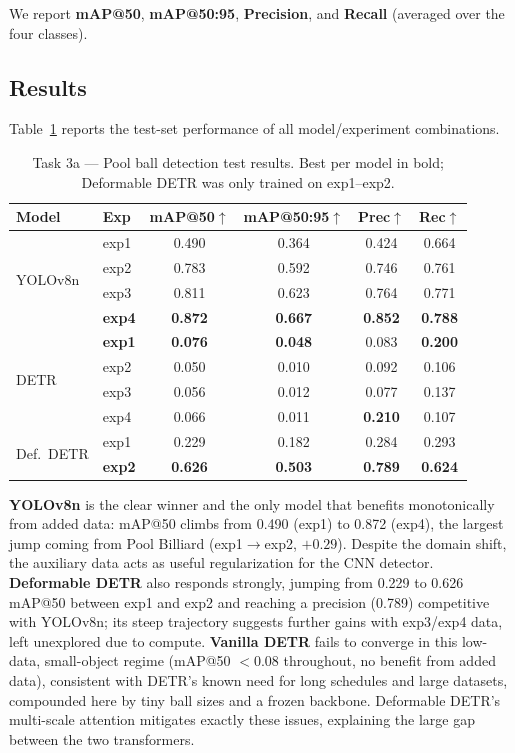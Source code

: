 \documentclass[conference, 10pt]{IEEEtran}
\begin{document}
We report \textbf{mAP@50}, \textbf{mAP@50:95}, \textbf{Precision}, and \textbf{Recall} (averaged over the four classes).

\subsection{Results}

Table~\ref{tab:task3a_results} reports the test-set performance of all model/experiment combinations.

\begin{table}[h]
\centering
\caption{Task 3a --- Pool ball detection test results. Best per model in bold; Deformable DETR was only trained on exp1--exp2.}
\label{tab:task3a_results}
\setlength{\tabcolsep}{4pt}
\begin{tabular}{llcccc}
\toprule
\textbf{Model} & \textbf{Exp} & \textbf{mAP@50}$\uparrow$ & \textbf{mAP@50:95}$\uparrow$ & \textbf{Prec}$\uparrow$ & \textbf{Rec}$\uparrow$ \\
\midrule
\multirow{4}{*}{YOLOv8n}
  & exp1 & 0.490 & 0.364 & 0.424 & 0.664 \\
  & exp2 & 0.783 & 0.592 & 0.746 & 0.761 \\
  & exp3 & 0.811 & 0.623 & 0.764 & 0.771 \\
  & \textbf{exp4} & \textbf{0.872} & \textbf{0.667} & \textbf{0.852} & \textbf{0.788} \\
\midrule
\multirow{4}{*}{DETR}
  & \textbf{exp1} & \textbf{0.076} & \textbf{0.048} & 0.083 & \textbf{0.200} \\
  & exp2 & 0.050 & 0.010 & 0.092 & 0.106 \\
  & exp3 & 0.056 & 0.012 & 0.077 & 0.137 \\
  & exp4 & 0.066 & 0.011 & \textbf{0.210} & 0.107 \\
\midrule
\multirow{2}{*}{Def.\ DETR}
  & exp1 & 0.229 & 0.182 & 0.284 & 0.293 \\
  & \textbf{exp2} & \textbf{0.626} & \textbf{0.503} & \textbf{0.789} & \textbf{0.624} \\
\bottomrule
\end{tabular}
\end{table}

\textbf{YOLOv8n} is the clear winner and the only model that benefits monotonically from added data: mAP@50 climbs from 0.490 (exp1) to 0.872 (exp4), the largest jump coming from Pool Billiard (exp1$\rightarrow$exp2, $+0.29$). Despite the domain shift, the auxiliary data acts as useful regularization for the CNN detector.
\textbf{Deformable DETR} also responds strongly, jumping from 0.229 to 0.626 mAP@50 between exp1 and exp2 and reaching a precision (0.789) competitive with YOLOv8n; its steep trajectory suggests further gains with exp3/exp4 data, left unexplored due to compute.
\textbf{Vanilla DETR} fails to converge in this low-data, small-object regime (mAP@50 $<0.08$ throughout, no benefit from added data), consistent with DETR's known need for long schedules and large datasets, compounded here by tiny ball sizes and a frozen backbone. Deformable DETR's multi-scale attention mitigates exactly these issues, explaining the large gap between the two transformers.
\end{document}
